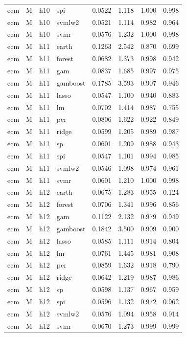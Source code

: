 \begin{ThreePartTable}
\begin{longtable}[t]{llclcccc}
ecm & M & h10 & spi & 0.0522 & 1.118 & 1.000 & 0.998\\
ecm & M & h10 & svmlw2 & 0.0521 & 1.114 & 0.982 & 0.964\\
ecm & M & h10 & svmr & 0.0576 & 1.232 & 1.000 & 0.998\\
\addlinespace
ecm & M & h11 & earth & 0.1263 & 2.542 & 0.870 & 0.699\\
ecm & M & h11 & forest & 0.0682 & 1.373 & 0.998 & 0.942\\
ecm & M & h11 & gam & 0.0837 & 1.685 & 0.997 & 0.975\\
ecm & M & h11 & gamboost & 0.1785 & 3.593 & 0.907 & 0.946\\
ecm & M & h11 & lasso & 0.0547 & 1.100 & 0.940 & 0.883\\
ecm & M & h11 & lm & 0.0702 & 1.414 & 0.987 & 0.755\\
ecm & M & h11 & pcr & 0.0806 & 1.622 & 0.922 & 0.849\\
ecm & M & h11 & ridge & 0.0599 & 1.205 & 0.989 & 0.987\\
ecm & M & h11 & sp & 0.0601 & 1.209 & 0.988 & 0.943\\
ecm & M & h11 & spi & 0.0547 & 1.101 & 0.994 & 0.985\\
ecm & M & h11 & svmlw2 & 0.0546 & 1.098 & 0.974 & 0.961\\
ecm & M & h11 & svmr & 0.0601 & 1.210 & 1.000 & 0.998\\
\addlinespace
ecm & M & h12 & earth & 0.0675 & 1.283 & 0.955 & 0.124\\
ecm & M & h12 & forest & 0.0706 & 1.341 & 0.996 & 0.856\\
ecm & M & h12 & gam & 0.1122 & 2.132 & 0.979 & 0.949\\
ecm & M & h12 & gamboost & 0.1842 & 3.500 & 0.909 & 0.900\\
ecm & M & h12 & lasso & 0.0585 & 1.111 & 0.914 & 0.804\\
ecm & M & h12 & lm & 0.0761 & 1.445 & 0.981 & 0.908\\
ecm & M & h12 & pcr & 0.0859 & 1.632 & 0.918 & 0.790\\
ecm & M & h12 & ridge & 0.0642 & 1.219 & 0.987 & 0.986\\
ecm & M & h12 & sp & 0.0598 & 1.137 & 0.967 & 0.959\\
ecm & M & h12 & spi & 0.0596 & 1.132 & 0.972 & 0.962\\
ecm & M & h12 & svmlw2 & 0.0576 & 1.094 & 0.958 & 0.914\\
ecm & M & h12 & svmr & 0.0670 & 1.273 & 0.999 & 0.999\\

\end{longtable}
\end{ThreePartTable}
